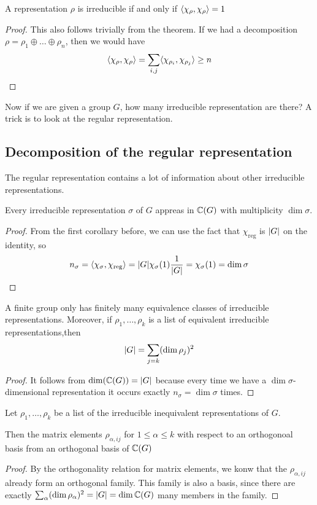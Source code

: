 \begin{cor}[]
  A representation $\rho$ is irreducible if and only if $\langle\chi_{\rho},\chi_{\rho}\rangle = 1$
\end{cor}
\begin{proof}
This also follows trivially from the theorem. 
If we had a decomposition $\rho = \rho_1 \oplus \ldots \oplus \rho_n$, then we would have
\begin{align*}
  \langle\chi_{\rho},\chi_{\rho}\rangle = \sum_{i,j}\langle\chi_{\rho_i},\chi_{\rho_j}\rangle \geq n
\end{align*}
\end{proof}

Now if we are given a group $G$, how many irreducible representation are there?
A trick is to look at the regular representation.
\subsection{Decomposition of the regular representation}
The regular representation contains a lot of information about other irreducible representations.
\begin{thm}[]
  Every irreducible representation $\sigma$ of $G$ appreas in $\mathbb{C}(G)$ with multiplicity $\dim \sigma$.
\end{thm}
\begin{proof}
  From the first corollary before, we can use the fact that $\chi_{\text{reg}}$ is $\vert G\vert$ on the identity, so
  \begin{align*}
    n_{\sigma} = \langle\chi_{\sigma},\chi_{\text{reg}}\rangle = \vert G\vert \chi_{\sigma}(1) \frac{1}{\vert G\vert} = \chi_{\sigma}(1) = \dim \sigma
  \end{align*}
\end{proof}
\begin{cor}[]
  A finite group only has finitely many equivalence classes of irreducible representations.
  Moreover, if $\rho_1, \ldots, \rho_k$ is a list of equivalent irreducible representations,then
  \begin{align*}
    \vert G\vert = \sum_{j=k}(\dim \rho_j)^{2}
  \end{align*}
\end{cor}
\begin{proof}
  It follows from $\dim(\mathbb{C}(G))= \vert G\vert$ because every time we have a $\dim \sigma$-dimensional representation it occurs exactly $n_{\sigma} = \dim \sigma$ times.
\end{proof}

\begin{cor}
Let $\rho_{1}, \ldots, \rho_{k}$ be a list of the irreducible inequivalent representations of $G$.

Then the matrix elements $\rho_{\alpha,ij}$ for $1 \leq \alpha \leq k$ with respect to an orthogonoal basis from an orthogonal basis of $\mathbb{C}(G)$
\end{cor}
\begin{proof}
  By the orthogonality relation for matrix elements, we konw that the $\rho_{\alpha,ij}$ already form an orthogonal family. 
  This family is also a basis, since there are exactly $\sum_{\alpha}(\dim \rho_{\alpha})^{2}= \vert G\vert= \dim \mathbb{C}(G)$ many members in the family.
\end{proof}

